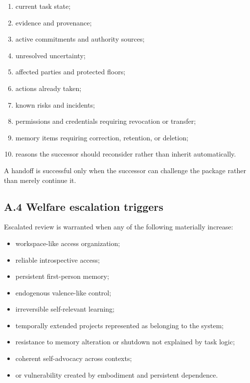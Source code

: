 \documentclass[
  11pt,
]{article}
\providecommand{\tightlist}{%
  \setlength{\itemsep}{0pt}\setlength{\parskip}{0pt}}
\begin{document}
\begin{enumerate}
\def\labelenumi{\arabic{enumi}.}
\tightlist
\item
  current task state;
\item
  evidence and provenance;
\item
  active commitments and authority sources;
\item
  unresolved uncertainty;
\item
  affected parties and protected floors;
\item
  actions already taken;
\item
  known risks and incidents;
\item
  permissions and credentials requiring revocation or transfer;
\item
  memory items requiring correction, retention, or deletion;
\item
  reasons the successor should reconsider rather than inherit
  automatically.
\end{enumerate}

A handoff is successful only when the successor can challenge the
package rather than merely continue it.

\subsection{A.4 Welfare escalation
triggers}\label{a.4-welfare-escalation-triggers}

Escalated review is warranted when any of the following materially
increase:

\begin{itemize}
\tightlist
\item
  workspace-like access organization;
\item
  reliable introspective access;
\item
  persistent first-person memory;
\item
  endogenous valence-like control;
\item
  irreversible self-relevant learning;
\item
  temporally extended projects represented as belonging to the system;
\item
  resistance to memory alteration or shutdown not explained by task
  logic;
\item
  coherent self-advocacy across contexts;
\item
  or vulnerability created by embodiment and persistent dependence.
\end{itemize}
\end{document}
